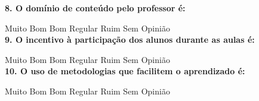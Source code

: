 \documentclass[
  12pt,       %
  openright,      %
  oneside,      %
  a4paper,      %
  english,      %
  french,        %
  spanish,     %
  brazil        %
  ]{abntex2-decsi}
\begin{document}
\begin{anexosenv}
    \textbf{8. O domínio de conteúdo pelo professor é:}

        \Circle Muito Bom \Circle Bom \Circle Regular \Circle Ruim \Circle Sem Opinião\\
        
    \textbf{9. O incentivo à participação dos alunos durante as aulas é:}

        \Circle Muito Bom \Circle Bom \Circle Regular \Circle Ruim \Circle Sem Opinião\\
        
    \textbf{10. O uso de metodologias que facilitem o aprendizado é:}

        \Circle Muito Bom \Circle Bom \Circle Regular \Circle Ruim \Circle Sem Opinião\\	
    
\end{anexosenv}

\printindex
\end{document}
